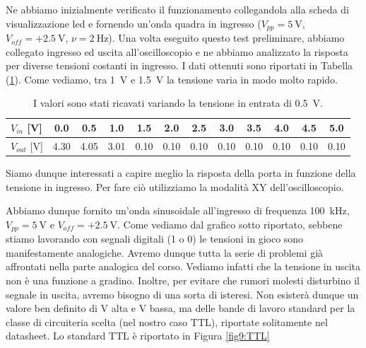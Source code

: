 Ne abbiamo inizialmente verificato il funzionamento collegandola alla scheda di visualizzazione led e fornendo un'onda quadra in ingresso ($V_{pp}=\SI{5}{\volt}$, $V_{off}=+\SI{2.5}{\volt}$, $\nu=\SI{2}{\hertz}$).
Una volta eseguito questo test preliminare, abbiamo collegato ingresso ed uscita all'oscilloscopio e ne abbiamo analizzato la risposta per diverse tensioni costanti in ingresso.
I dati ottenuti sono riportati in Tabella (\ref{tab9:risposta2}).
Come vediamo, tra \SI{1}{\volt} e \SI{1.5}{\volt} la tensione varia in modo molto rapido.

\vspace{2mm}
\begin{table}[htpc]
\centering
{\renewcommand{\arraystretch}{1.1}%
\begin{tabular}{|l|c|c|c|c|c|c|c|c|c|c|c|}
\hline
$V_{in}$ [\si{\volt}] & 0.0 & 0.5 & 1.0 & 1.5 & 2.0 & 2.5 & 3.0 & 3.5 & 4.0 & 4.5 & 5.0 \\
\hline
$V_{out}$ [\si{\volt}] & 4.30 & 4.05 & 3.01 & 0.10 & 0.10 & 0.10 & 0.10 & 0.10 & 0.10 & 0.10 & 0.10 \\
\hline
\end{tabular}}
\caption{I valori sono stati ricavati variando la tensione in entrata di \SI{.5}{\V}.}
\label{tab9:risposta2}
\end{table}

Siamo dunque interessati a capire meglio la risposta della porta in funzione della tensione in ingresso.
Per fare ciò utilizziamo la modalità XY dell'oscilloscopio.

Abbiamo dunque fornito un'onda sinusoidale all'ingresso di frequenza \SI{100}{\kilo\hertz}, $V_{pp}=\SI{5}{\volt}$ e $V_{off}=+\SI{2.5}{\volt}$.
Come vediamo dal grafico sotto riportato, sebbene stiamo lavorando con segnali digitali (1 o 0) le tensioni in gioco sono manifestamente analogiche.
Avremo dunque tutta la serie di problemi già affrontati nella parte analogica del corso.
Vediamo infatti che la tensione in uscita non è una funzione a gradino.
Inoltre, per evitare che rumori molesti disturbino il segnale in uscita, avremo bisogno di una sorta di isteresi.
Non esisterà dunque un valore ben definito di V alta e V bassa, ma delle bande di lavoro standard per la classe di circuiteria scelta (nel nostro caso TTL), riportate solitamente nel datasheet.
Lo standard TTL è riportato in Figura \ref{fig9:TTL}

